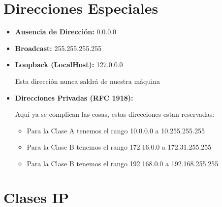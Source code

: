 \documentclass[12pt, fleqn]{report}                             %
\theoremstyle{break}                                            %
\newcommand{\Color}[2]{\textcolor{#1}{#2}}                      %
\begin{document}
        \clearpage
        \section{Direcciones Especiales}

            \begin{itemize}
                \item \textbf{Ausencia de Dirección:} \Color{Blue700MD}{0.0.0.0}
                \item \textbf{Broadcast:} \Color{Blue700MD}{255.255.255.255}
                \item \textbf{Loopback (LocalHost):} \Color{Blue700MD}{127.0.0.0}

                    Esta dirección nunca saldrá de nuestra máquina

                \item \textbf{Direcciones Privadas (RFC 1918):} 

                    Aquí ya se complican las cosas, estas direcciones estan reservadas:
                    \begin{itemize}
                        \item Para la Clase A tenemos el rango \Color{Blue700MD}{10.0.0.0} a \Color{Blue700MD}{10.255.255.255}
                        \item Para la Clase B tenemos el rango \Color{Blue700MD}{172.16.0.0} a \Color{Blue700MD}{172.31.255.255}
                        \item Para la Clase B tenemos el rango \Color{Blue700MD}{192.168.0.0} a \Color{Blue700MD}{192.168.255.255}
                    \end{itemize}

            \end{itemize}


        \vspace{1em}
        \section{Clases IP}
\end{document}
